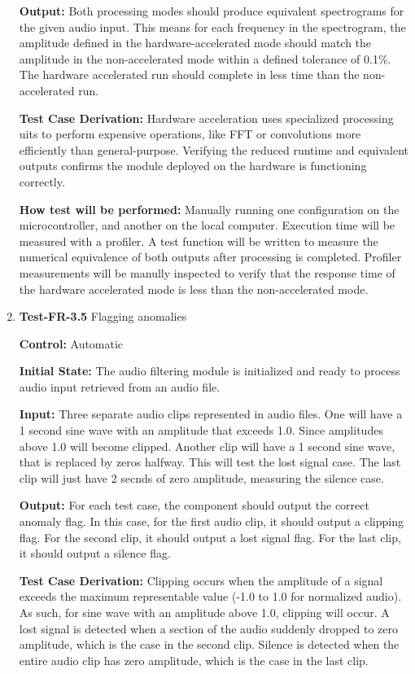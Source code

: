 \documentclass[12pt, titlepage]{article}
\begin{document}
\begin{enumerate}
\textbf{Output:}
Both processing modes should produce equivalent spectrograms for the given 
audio input. This means for each frequency in the spectrogram, the amplitude 
defined in the hardware-accelerated mode should match the amplitude in the 
non-accelerated mode within a defined tolerance of 0.1\%. The hardware 
accelerated run should complete in less time than the non-accelerated run.

\textbf{Test Case Derivation:} 
Hardware acceleration uses specialized processing uits to perform expensive 
operations, like FFT or convolutions more efficiently than general-purpose. 
Verifying the reduced runtime and equivalent outputs confirms the module 
deployed on the hardware is functioning correctly. 

\textbf{How test will be performed:}
Manually running one configuration on the microcontroller, and another on the 
local computer. Execution time will be measured with a profiler. A test 
function will be written to measure the numerical equivalence of both outputs 
after processing is completed. Profiler measurements will be manully inspected 
to verify that the 
response time of the hardware accelerated mode is less than the non-accelerated 
mode.

\item{\textbf{Test-FR-3.5} Flagging anomalies\\}

\textbf{Control:} Automatic
					
\textbf{Initial State:} 
The audio filtering module is initialized and ready to process audio input 
retrieved from an audio file. 
					
\textbf{Input:}
Three separate audio clips represented in audio files. One will have a 1 second 
sine wave with an amplitude that exceeds 1.0. Since amplitudes above 1.0 will 
become clipped. Another clip will have a 1 second sine wave, that is replaced 
by zeros halfway. This will test the lost signal case. The last clip will just 
have 2 secnds of zero amplitude, measuring the silence case. 
					
\textbf{Output:}
For each test case, the component should output the correct anomaly flag. 
In this case, for the first audio clip, it should output a clipping flag. 
For the second clip, it should output a lost signal flag. For the last clip, 
it should output a silence flag.

\textbf{Test Case Derivation:} 
Clipping occurs when the amplitude of a signal exceeds the maximum 
representable value (-1.0 to 1.0 for normalized audio). As such, for sine wave 
with an amplitude above 1.0, clipping will occur. A lost signal is detected 
when a section of the audio suddenly dropped to zero amplitude, which is the 
case in the second clip. Silence is detected when the entire audio clip has 
zero amplitude, which is the case in the last clip.


\end{enumerate}
\end{document}
